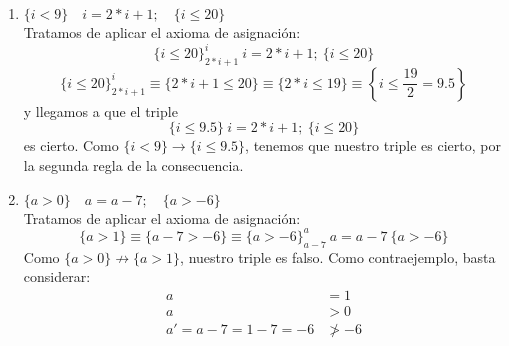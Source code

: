 \begin{ejercicio}
\begin{enumerate}
        \item $\{i < 9\} \quad i = 2 \ast i + 1; \quad \{ i \leq 20\}$\\
            Tratamos de aplicar el axioma de asignación:
            \begin{equation*}
                \{i\leq 20\}^i_{2\ast i+1}\ i = 2 \ast i + 1; \ \{ i \leq 20\}
            \end{equation*}
            \begin{equation*}
                \{i\leq 20\}^i_{2\ast i+1}\equiv \{2\ast i+1 \leq 20\} \equiv \{2\ast i \leq 19\} \equiv \left\{i\leq \frac{19}{2} = 9.5\right\}
            \end{equation*}
            y llegamos a que el triple
            \begin{equation*}
                \{i\leq 9.5\}\ i = 2 \ast i + 1; \ \{ i \leq 20\}
            \end{equation*}
            es cierto. Como $\{i<9\}\rightarrow\{i\leq 9.5\}$, tenemos que nuestro triple es cierto, por la segunda regla de la consecuencia.
        \item $\{a > 0\} \quad a = a - 7; \quad \{a > -6\}$\\
            Tratamos de aplicar el axioma de asignación:
            \begin{equation*}
                \{a>1\} \equiv \{a-7>-6\} \equiv \{a>-6\}^a_{a-7}\ a=a-7\ \{a>-6\}
            \end{equation*}
            Como $\{a>0\}\not\rightarrow \{a>1\}$, nuestro triple es falso. Como contraejemplo, basta considerar:
            \begin{align*}
                a &= 1 \\
                a &> 0 \\
                a' = a-7 = 1-7 = -6 &\not > -6
            \end{align*}
    \end{enumerate}
\end{ejercicio}

